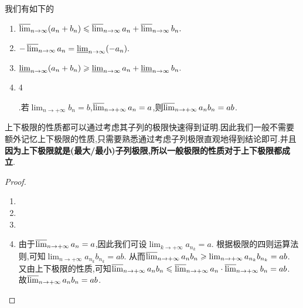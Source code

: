 \documentclass[../../main.tex]{subfiles}%
\begin{document}
\begin{proposition}[上下极限的性质]\label{proposition:上下极限的性质}
我们有如下的
\begin{enumerate}
\item $\varlimsup_{n \to \infty} (a_n + b_n) \leqslant  \varlimsup_{n \to \infty} a_n + \varlimsup_{n \to \infty} b_n.$

\item  $-\varlimsup_{n \to \infty} a_n = \varliminf_{n \to \infty} (-a_n).$

\item  $\varliminf_{n \to \infty} (a_n + b_n) \geqslant  \varliminf_{n \to \infty} a_n + \varliminf_{n \to \infty} b_n.$

\item\hypertarget{上极限的性质命题(4)}{4}.若\(\lim_{n \to +\infty} b_n = b\),\(\varlimsup_{n \to +\infty} a_n = a\),则\(\varlimsup_{n \to +\infty} a_n b_n = ab\).
\end{enumerate}
\end{proposition}
\begin{remark}
上下极限的性质都可以通过考虑其子列的极限快速得到证明.因此我们一般不需要额外记忆上下极限的性质,只需要熟悉通过考虑子列极限直观地得到结论即可.并且\textbf{因为上下极限就是(最大/最小)子列极限,所以一般极限的性质对于上下极限都成立}.
\end{remark}
\begin{proof}
\begin{enumerate}
\item 

\item 

\item 

\item 由于\(\varlimsup_{n \to +\infty} a_n = a\),因此我们可设\(\lim_{k \to +\infty} a_{n_k} = a\).
根据极限的四则运算法则,可知\(\lim_{n \to +\infty} a_{n_k} b_{n_k} = ab\).
从而\(\varlimsup_{n \to +\infty} a_n b_n \geqslant \lim_{n \to +\infty} a_{n_k} b_{n_k} = ab\).
又由上下极限的性质,可知\(\varlimsup_{n \to +\infty} a_n b_n \leqslant \varlimsup_{n \to +\infty} a_n \cdot \varlimsup_{n \to +\infty} b_n = ab\).
故\(\varlimsup_{n \to +\infty} a_n b_n = ab\).
\end{enumerate}
\end{proof}
\end{document}
